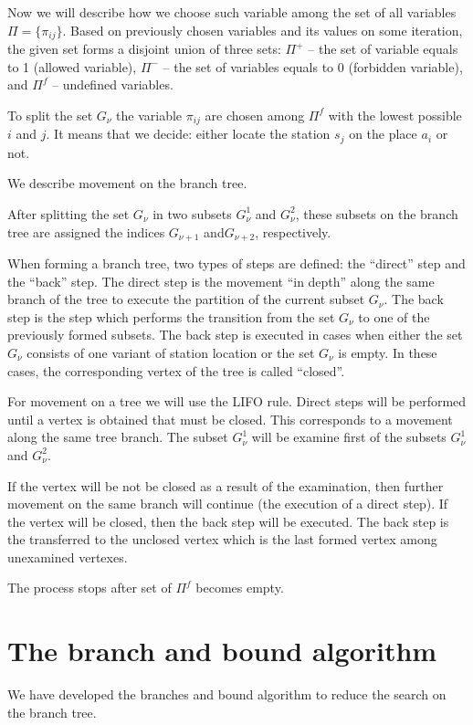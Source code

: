 Now we will describe how we choose such variable among the set of all variables $\Pi = \{\pi_{ij}\}$. Based on previously chosen variables and its values on some iteration, the given set forms a disjoint union of three sets: $\Pi^+$ – the set of variable equals to 1 (allowed variable), $\Pi^-$ – the set of variables equals to 0 (forbidden variable), and $\Pi^f$ – undefined variables.

To split the set $G_\nu$ the variable $\pi_{ij}$ are chosen among $\Pi^f$ with the lowest possible $i$ and $j$. It means that we decide: either locate the station $s_j$  on the place $a_i$ or not.

We describe movement on the branch tree.

After splitting the set $G_\nu$ in two subsets $G_\nu^1$  and $G_\nu^2$, these subsets on the branch tree are assigned the indices $G_{\nu+1}$  and$G_{\nu+2}$, respectively.

When forming a branch tree, two types of steps are defined: the “direct” step and the “back” step. The direct step is the movement “in depth” along the same branch of the tree to execute  the  partition of the current subset $G_\nu$. The back step is the step which performs the transition from the set $G_\nu$ to one of the previously formed subsets. The back step is executed in cases when either the set $G_\nu$  consists of one variant of  station location or the set $G_\nu$ is empty. In these cases, the corresponding vertex of the tree is called “closed”.

For movement on a tree we will use the LIFO rule. Direct steps will be performed until a vertex is obtained that must be closed. This corresponds to a movement along the same tree branch. The subset $G_\nu^1$ will be examine first of the subsets $G_\nu^1$  and $G_\nu^2$.

If the vertex will be not be closed as a result of the examination, then further movement on the same branch will continue (the execution of a direct step). If the vertex will be closed, then the back step will be executed. The back step is the transferred to the unclosed vertex which is the last formed vertex among unexamined vertexes.

The process stops after set of  $\Pi^f$ becomes empty.

\section{The branch and bound algorithm}\label{sec:proof}
We have developed the branches and bound algorithm to reduce the search on the branch tree.

